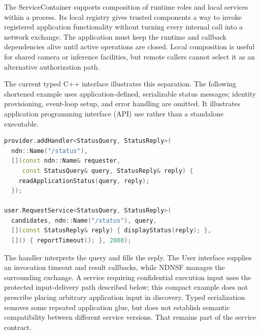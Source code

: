 The ServiceContainer supports composition of runtime roles and local services within a process. Its local registry gives trusted components a way to invoke registered application functionality without turning every internal call into a network exchange. The application must keep the runtime and callback dependencies alive until active operations are closed. Local composition is useful for shared camera or inference facilities, but remote callers cannot select it as an alternative authorization path.

The current typed C++ interface illustrates this separation. The following shortened example uses application-defined, serializable status messages; identity provisioning, event-loop setup, and error handling are omitted. It illustrates application programming interface (API) use rather than a standalone executable.
\begin{lstlisting}[language=C++,caption={Typed registration and invocation of a compact status service.}]
provider.addHandler<StatusQuery, StatusReply>(
  ndn::Name("/status"),
  [](const ndn::Name& requester,
     const StatusQuery& query, StatusReply& reply) {
    readApplicationStatus(query, reply);
  });

user.RequestService<StatusQuery, StatusReply>(
  candidates, ndn::Name("/status"), query,
  [](const StatusReply& reply) { displayStatus(reply); },
  []() { reportTimeout(); }, 2000);
\end{lstlisting}

The handler interprets the query and fills the reply. The User interface supplies an invocation timeout and result callbacks, while NDNSF manages the surrounding exchange. A service requiring confidential execution input uses the protected input-delivery path described below; this compact example does not prescribe placing arbitrary application input in discovery. Typed serialization removes some repeated application glue, but does not establish semantic compatibility between different service versions. That remains part of the service contract.
